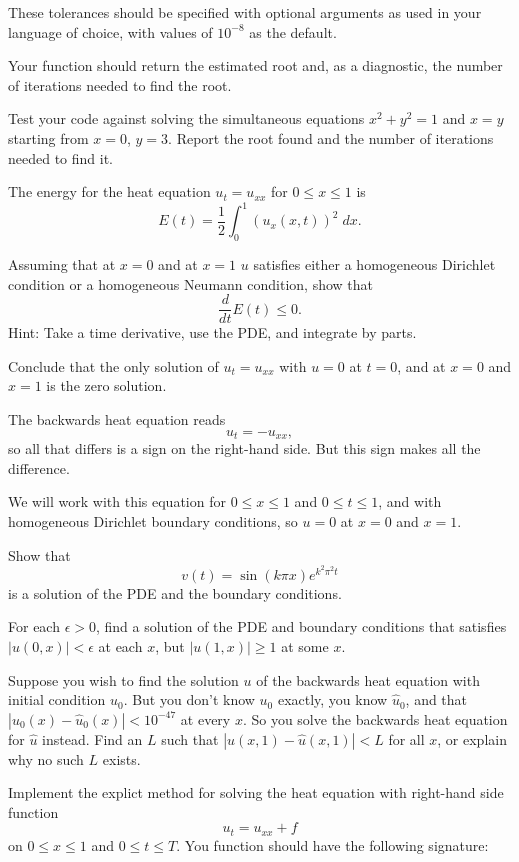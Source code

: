 \documentclass[minion]{homework}
\begin{document}
\begin{problems}
These tolerances should be specified with optional arguments 
as used in your language of choice, with values of $10^{-8}$ as the default.

Your function should return the estimated root and, as a diagnostic, the number of iterations needed to find the root.

Test your code against solving the simultaneous equations
$x^2+y^2=1$ and $x=y$ starting from $x=0$, $y=3$.  Report the root found and the number of iterations needed to find it.

\problem The energy for the heat equation $u_t=u_{xx}$ 
for $0\le x\le 1$ is
\[
E(t) = \frac{1}{2}\int_0^1 (u_x(x,t))^2\;dx.
\]
\begin{subproblems}
\item Assuming that at $x=0$ and at $x=1$ $u$ satisfies either
a homogeneous Dirichlet condition or a homogeneous Neumann condition,
show that
\[
\frac{d}{dt} E(t) \le 0.
\]
Hint: Take a time derivative, use the PDE, and integrate by parts.
\item Conclude that the only solution of $u_t=u_{xx}$ with $u=0$
at $t=0$, and at $x=0$ and $x=1$ is the zero solution.
\end{subproblems}

\problem The backwards heat equation reads
\[
u_t = -u_{xx},
\]
so all that differs is a sign on the right-hand side.  But this sign makes all the difference.

We will work with this equation for $0\le x \le 1$ and $0\le t\le 1$, and
with homogeneous Dirichlet boundary conditions, so $u=0$ at $x=0$ and $x=1$.
\begin{subproblems}
\item Show that 
\[
v(t) = \sin(k\pi x) e^{k^2\pi^2 t}
\]
is a solution of the PDE and the boundary conditions.
\item For each $\epsilon>0$, find a solution of the PDE and boundary conditions
that satisfies $|u(0,x)|<\epsilon$ at each $x$, but $|u(1,x)|\ge 1$ at some $x$.
\item Suppose you wish to find the solution $u$ of the backwards heat equation with initial condition $u_0$.  But you don't know $u_0$ exactly, you know $\hat u_0$,
and that $|u_0(x)-\hat u_0(x)|<10^{-47}$ at every $x$.  So you solve the
backwards heat equation for $\hat u$ instead.
Find an $L$ such that $|u(x,1)-\hat u(x,1)|<L$ for all $x$, or
explain why no such $L$ exists.
\end{subproblems}

 Implement the explict method for solving the heat equation with
right-hand side function
\[
u_t=u_{xx} + f
\]
on $0\le x \le 1$ and $0\le t\le T$.  You function should have
the following signature:


\end{problems}
\end{document}
